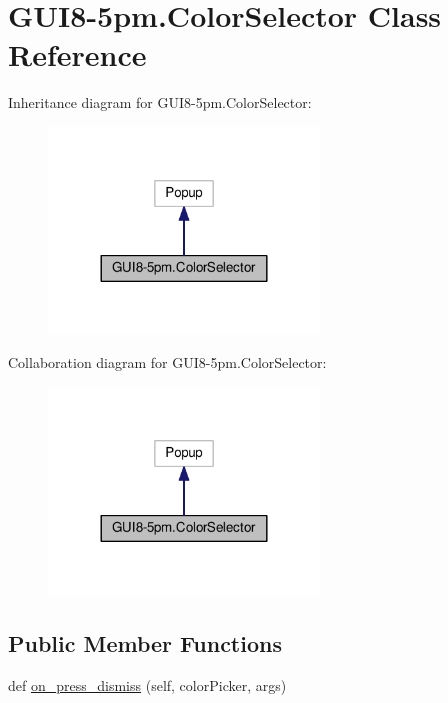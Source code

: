 \hypertarget{classGUI8-5pm_1_1ColorSelector}{}\section{G\+U\+I8-\/5pm.Color\+Selector Class Reference}
\label{classGUI8-5pm_1_1ColorSelector}


Inheritance diagram for G\+U\+I8-\/5pm.Color\+Selector\+:
\nopagebreak
\begin{figure}[H]
\begin{center}
\leavevmode
\includegraphics[width=204pt]{classGUI8-5pm_1_1ColorSelector__inherit__graph}
\end{center}
\end{figure}


Collaboration diagram for G\+U\+I8-\/5pm.Color\+Selector\+:
\nopagebreak
\begin{figure}[H]
\begin{center}
\leavevmode
\includegraphics[width=204pt]{classGUI8-5pm_1_1ColorSelector__coll__graph}
\end{center}
\end{figure}
\subsection*{Public Member Functions}
\begin{DoxyCompactItemize}
\item 
def \hyperlink{classGUI8-5pm_1_1ColorSelector_ad066b578ca09bc8910db73c32741b8f8}{on\+\_\+press\+\_\+dismiss} (self, color\+Picker, args)
\end{DoxyCompactItemize}
